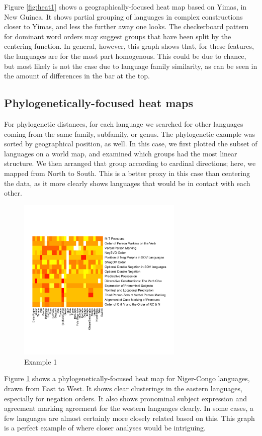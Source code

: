 \documentclass[11pt]{article}
\begin{document}
Figure \ref{fig:heat1} shows a geographically-focused heat map based on Yimas, in New Guinea. It shows partial grouping of languages in complex constructions closer to Yimas, and less the further away one looks. The checkerboard pattern for dominant word orders may suggest groups that have been split by the centering function. In general, however, this graph shows that, for these features, the languages are for the most part homogenous. This could be due to chance, but most likely is not the case due to language family similarity, as can be seen in the amount of differences in the bar at the top. 

\subsection{Phylogenetically-focused heat maps}

For phylogenetic distances, for each language we searched for other languages coming from the same family, subfamily, or genus.
The phylogenetic example was sorted by geographical position, as well. In this case, we first plotted the subset of languages on a world map, and examined which groups had the most linear structure. We then arranged that group according to cardinal directions; here, we mapped from North to South. This is a better proxy in this case than centering the data, as it more clearly shows languages that would be in contact with each other. 


\begin{figure}[ht!]
\includegraphics[width=3.1in]
{graph3nigercongosmall.pdf} 
\caption{Example 1} 
\label{fig:heat2} 
\end{figure}


Figure \ref{fig:heat2} shows a phylogenetically-focused heat map for Niger-Congo languages, drawn from East to West. It shows clear clusterings in the eastern languages, especially for negation orders. It also shows pronominal subject expression and agreement marking agreement for the western languages clearly. In some cases, a few languages are almost certainly more closely related based on this. This graph is a perfect example of where closer analyses would be intriguing. 
\end{document}
